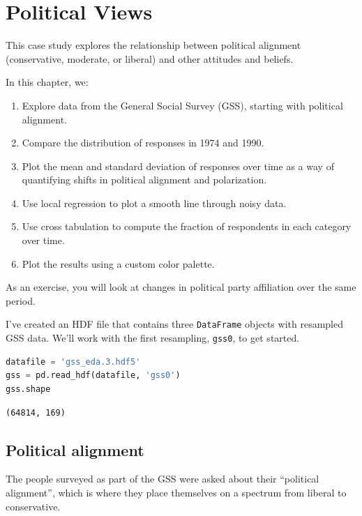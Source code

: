 \hypertarget{political-views}{%
\chapter{Political Views}\label{political-views}}

This case study explores the relationship between political alignment
(conservative, moderate, or liberal) and other attitudes and beliefs.

In this chapter, we:

\begin{enumerate}
\def\labelenumi{\arabic{enumi}.}
\item
  Explore data from the General Social Survey (GSS), starting with
  political alignment.
\item
  Compare the distribution of responses in 1974 and 1990.
\item
  Plot the mean and standard deviation of responses over time as a way
  of quantifying shifts in political alignment and polarization.
\item
  Use local regression to plot a smooth line through noisy data.
\item
  Use cross tabulation to compute the fraction of respondents in each
  category over time.
\item
  Plot the results using a custom color palette.
\end{enumerate}

As an exercise, you will look at changes in political party affiliation
over the same period.

I've created an HDF file that contains three
\passthrough{\lstinline!DataFrame!} objects with resampled GSS data.
We'll work with the first resampling, \passthrough{\lstinline!gss0!}, to
get started.

\begin{lstlisting}[language=Python,style=source]
datafile = 'gss_eda.3.hdf5'
gss = pd.read_hdf(datafile, 'gss0')
gss.shape
\end{lstlisting}

\begin{lstlisting}[style=output]
(64814, 169)
\end{lstlisting}

\hypertarget{political-alignment}{%
\section{Political alignment}\label{political-alignment}}

The people surveyed as part of the GSS were asked about their
``political alignment'', which is where they place themselves on a
spectrum from liberal to conservative.

